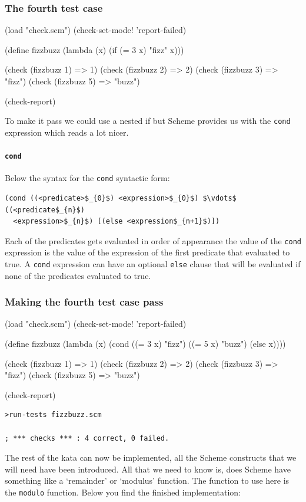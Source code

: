 \documentclass[12pt,a4paper,english,twoside]{article}
\begin{document}
\subsubsection{The fourth test case}
\begin{schemecode}
(load "check.scm")
(check-set-mode! 'report-failed)

(define fizzbuzz (lambda (x) (if (= 3 x) "fizz" x)))

(check (fizzbuzz 1) => 1)
(check (fizzbuzz 2) => 2)
(check (fizzbuzz 3) => "fizz")
(check (fizzbuzz 5) => "buzz")

(check-report)
\end{schemecode}
To make it pass we could use a nested if but Scheme provides us with the 
\texttt{cond} expression which reads a lot nicer.
\paragraph{\texttt{cond}}
Below the syntax for the \texttt{cond} syntactic form:
\begin{lstlisting}[mathescape]
  (cond ((<predicate>$_{0}$) <expression>$_{0}$) $\vdots$ ((<predicate$_{n}$) 
  <expression>$_{n}$) [(else <expression$_{n+1}$)])
\end{lstlisting}
Each of the predicates gets evaluated in order of appearance the value of the 
\texttt{cond} expression is the value of the expression of the first predicate 
that evaluated to true. A \texttt{cond} expression can have an optional 
\texttt{else} clause that will be evaluated if none of the predicates 
evaluated to true.
\subsubsection{Making the fourth test case pass}
\begin{schemecode}
(load "check.scm")
(check-set-mode! 'report-failed)

(define fizzbuzz (lambda (x) (cond ((= 3 x) "fizz")
          ((= 5 x) "buzz")
          (else x))))

(check (fizzbuzz 1) => 1)
(check (fizzbuzz 2) => 2)
(check (fizzbuzz 3) => "fizz")
(check (fizzbuzz 5) => "buzz")

(check-report)
\end{schemecode}
\begin{lstlisting}
>run-tests fizzbuzz.scm

; *** checks *** : 4 correct, 0 failed.  \end{lstlisting}
The rest of the kata can now be implemented, all the Scheme constructs that we 
will need have been introduced. All that we need to know is, does Scheme have 
something like a `remainder' or `modulus' function. The function to use here 
is the \texttt{modulo} function. Below you find the finished implementation:
\end{document}
